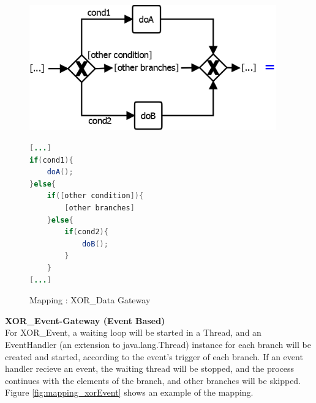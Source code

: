 \begin{figure}[h]
\begin{minipage}[c]{0.5\textwidth}
\includegraphics[width=0.95\textwidth]{images/mapping/xor-data.png}
\end{minipage}
\begin{minipage}[c]{0.5\textwidth}
\begin{lstlisting}[language=Java]
[...]
if(cond1){
	doA();
}else{
	if([other condition]){
		[other branches]
	}else{
		if(cond2){
			doB();
		}
	}
[...]
\end{lstlisting}
\end{minipage}
\caption{Mapping : XOR\_Data Gateway}%
\label{fig:mapping_xorData}%
\end{figure}

\textbf{XOR\_Event-Gateway (Event Based)}\\
For XOR\_Event, a waiting loop will be started in a Thread, and an EventHandler (an extension to java.lang.Thread) instance for each branch will be created and started, according to the event's trigger of each branch. If an event handler recieve an event, the waiting thread will be stopped, and the process continues with the elements of the branch, and other branches will be skipped. Figure \ref{fig:mapping_xorEvent} shows an example of the mapping.

